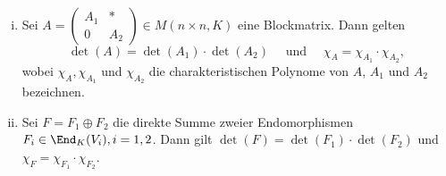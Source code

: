 \begin{lemma}
	\label{lemma:9.8}
	\mbox{} \\[-1.4cm]
	\begin{enumerate}[(i)]
		\item Sei $A = \begin{pmatrix}
		A_1 & * \\
		0 & A_2
		\end{pmatrix} \in M(n \times n, K)$ eine Blockmatrix.
		Dann gelten
		\[
			\det(A) = \det(A_1) \cdot \det(A_2) \quad \text{ und } \quad \chi_A = \chi_{A_1} \cdot \chi_{A_2},
		\]
		wobei $\chi_A, \chi_{A_1}$ und $\chi_{A_2}$ die charakteristischen Polynome von $A$, $A_1$ und $A_2$ bezeichnen.
		\item Sei $F = F_1 \oplus F_2$ die direkte Summe zweier Endomorphismen $F_i \in \End_K(V_i), i=1,2$.
		Dann gilt $\det(F) = \det(F_1) \cdot \det(F_2)$ und $\chi_F = \chi_{F_1} \cdot \chi_{F_2}$.
	\end{enumerate}
\end{lemma}

